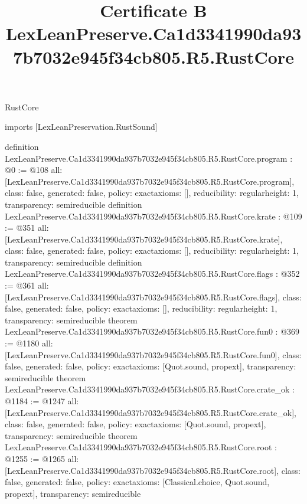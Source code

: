 \begin{lexlean}{RustCore}
\title{Certificate B LexLeanPreserve.Ca1d3341990da937b7032e945f34cb805.R5.RustCore}
\begin{coremodule}
imports [LexLeanPreservation.RustSound]

definition LexLeanPreserve.Ca1d3341990da937b7032e945f34cb805.R5.RustCore.program : @0 := @108 {
  all: [LexLeanPreserve.Ca1d3341990da937b7032e945f34cb805.R5.RustCore.program],
  class: false,
  generated: false,
  policy: exact{axioms: []},
  reducibility: regular{height: 1},
  transparency: semireducible
}
definition LexLeanPreserve.Ca1d3341990da937b7032e945f34cb805.R5.RustCore.krate : @109 := @351 {
  all: [LexLeanPreserve.Ca1d3341990da937b7032e945f34cb805.R5.RustCore.krate],
  class: false,
  generated: false,
  policy: exact{axioms: []},
  reducibility: regular{height: 1},
  transparency: semireducible
}
definition LexLeanPreserve.Ca1d3341990da937b7032e945f34cb805.R5.RustCore.flags : @352 := @361 {
  all: [LexLeanPreserve.Ca1d3341990da937b7032e945f34cb805.R5.RustCore.flags],
  class: false,
  generated: false,
  policy: exact{axioms: []},
  reducibility: regular{height: 1},
  transparency: semireducible
}
theorem LexLeanPreserve.Ca1d3341990da937b7032e945f34cb805.R5.RustCore.fun0 : @369 := @1180 {
  all: [LexLeanPreserve.Ca1d3341990da937b7032e945f34cb805.R5.RustCore.fun0],
  class: false,
  generated: false,
  policy: exact{axioms: [Quot.sound, propext]},
  transparency: semireducible
}
theorem LexLeanPreserve.Ca1d3341990da937b7032e945f34cb805.R5.RustCore.crate_ok : @1184 := @1247 {
  all: [LexLeanPreserve.Ca1d3341990da937b7032e945f34cb805.R5.RustCore.crate_ok],
  class: false,
  generated: false,
  policy: exact{axioms: [Quot.sound, propext]},
  transparency: semireducible
}
theorem LexLeanPreserve.Ca1d3341990da937b7032e945f34cb805.R5.RustCore.root : @1255 := @1265 {
  all: [LexLeanPreserve.Ca1d3341990da937b7032e945f34cb805.R5.RustCore.root],
  class: false,
  generated: false,
  policy: exact{axioms: [Classical.choice, Quot.sound, propext]},
  transparency: semireducible
}


\end{coremodule}
\end{lexlean}
